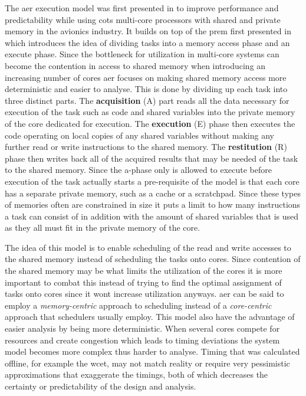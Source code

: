 \documentclass{kththesis}
\begin{document}
The \acrfull{aer} execution model was first presented in \parencite{durrieu_predictable_2014} to
improve performance and predictability while using \acrshort{cots} multi-core processors with shared
and private memory in the avionics industry. It builds on top of the \acrfull{prem} first presented
in \parencite{pellizzoni_predictable_2011} which introduces the idea of dividing tasks into a memory
access phase and an execute phase. Since the bottleneck for utilization in multi-core systems can
become the contention in access to shared memory when introducing an increasing number of cores
\acrshort{aer} focuses on making shared memory access more deterministic and easier to analyse. This
is done by dividing up each task into three distinct parts. The \textbf{acquisition} (A) part reads all
the data necessary for execution of the task such as code and shared variables into the private
memory of the core dedicated for execution. The \textbf{execution} (E) phase then executes the code
operating on local copies of any shared variables without making any further read or write
instructions to the shared memory. The \textbf{restitution} (R) phase then writes back all of the
acquired results that may be needed of the task to the shared memory. Since the \acrshort{a}-phase
only is allowed to execute before execution of the task actually starts a pre-requisite of the model
is that each core has a separate private memory, such as a cache or a scratchpad. Since these types
of memories often are constrained in size it puts a limit to how many instructions a task can
consist of in addition with the amount of shared variables that is used as they all must fit in
the private memory of the core.

The idea of this model is to enable scheduling of the read and write accesses to the shared memory
instead of scheduling the tasks onto cores. Since contention of the shared memory may be what limits
the utilization of the cores it is more important to combat this instead of trying to find the
optimal assignment of tasks onto cores since it wont increase utilization anyways. \acrshort{aer}
can be said to employ a \textit{memory-centric} approach to scheduling instead of a
\textit{core-centric} approach that schedulers usually employ. This model also have the advantage of
easier analysis by being more deterministic. When several cores compete for resources and create
congestion which leads to timing deviations the system model becomes more complex thus harder to
analyse. Timing that was calculated offline, for example the \acrshort{wcet}, may not match reality
or require very pessimistic approximations that exaggerate the timings, both of which decreases the
certainty or predictability of the design and analysis.
\end{document}
